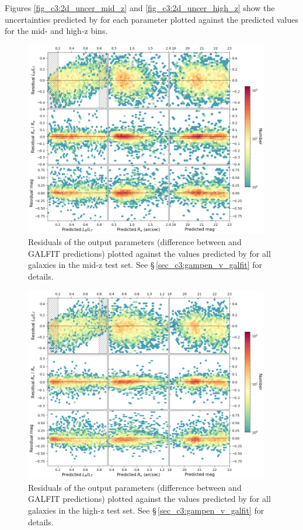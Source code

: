 Figures \ref{fig_c3:2d_uncer_mid_z} and \ref{fig_c3:2d_uncer_high_z} show the uncertainties predicted by \gampen{} for each parameter plotted against the predicted values for the mid- and high-z bins.

\begin{figure}[htb]
    \centering
    \includegraphics[width = 0.95\textwidth]{2d_res_mid_z.png}
    \caption{Residuals of the output parameters (difference between \gampen{} and GALFIT predictions) plotted against the values predicted by \gampen{} for all galaxies in the mid-z test set. See \S\,\ref{sec_c3:gampen_v_galfit} for details.}
    \label{fig_c3:2d_res_mid_z}
\end{figure}

\begin{figure}[htb]
    \centering
    \includegraphics[width = 0.95\textwidth]{2d_res_high_z.png}
    \caption{Residuals of the output parameters (difference between \gampen{} and GALFIT predictions) plotted against the values predicted by \gampen{} for all galaxies in the high-z test set. See \S\,\ref{sec_c3:gampen_v_galfit} for details.}
    \label{fig_c3:2d_res_high_z}
\end{figure}

